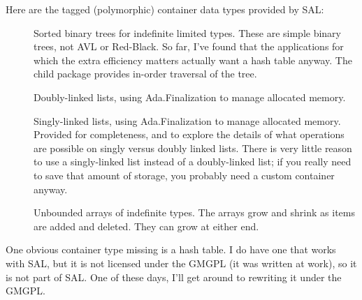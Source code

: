 \documentclass{article}
\begin{document}
Here are the tagged (polymorphic) container data types provided by SAL:
\begin{description}
\item [] Sorted binary trees for
  indefinite limited types. These are simple binary trees, not AVL or
  Red-Black. So far, I've found that the applications for which the
  extra efficiency matters actually want a hash table anyway. The
  child package  provides in-order traversal of the
  tree.

\item [] Doubly-linked lists, using
  Ada.Finalization to manage allocated memory.

\item [] Singly-linked lists, using
  Ada.Finalization to manage allocated memory. Provided for
  completeness, and to explore the details of what operations are
  possible on singly versus doubly linked lists. There is very little
  reason to use a singly-linked list instead of a doubly-linked list;
  if you really need to save that amount of storage, you probably need
  a custom container anyway.

\item [] Unbounded arrays of
  indefinite types. The arrays grow and shrink as items are added and
  deleted. They can grow at either end.

\end{description}
One obvious container type missing is a hash table. I do have one that
works with SAL, but it is not licensed under the GMGPL (it was written
at work), so it is not part of SAL. One of these days, I'll get around
to rewriting it under the GMGPL.
\end{document}

